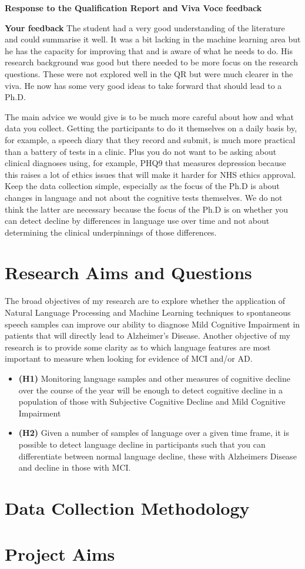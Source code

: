 \documentclass[11pt]{article}
\begin{document}
\textbf{Response to the Qualification Report and Viva Voce feedback}
\par 
\textbf{Your feedback}
The student had a very good understanding of the literature and could summarise it well. It was a bit lacking in the machine learning area but he has the capacity for improving that and is aware of what he needs to do. His research background was good but there needed to be more focus on the research questions. These were not explored well in the QR but were much clearer in the viva. He now has some very good ideas to take forward that should lead to a Ph.D.
\par 
The main advice we would give is to be much more careful about how and what data you collect. Getting the participants to do it themselves on a daily basis by, for example, a speech diary that they record and submit, is much more practical than a battery of tests in a clinic. Plus you do not want to be asking about clinical diagnoses using, for example, PHQ9 that measures depression because this raises a lot of ethics issues that will make it harder for NHS ethics approval. Keep the data collection simple, especially as the focus of the Ph.D is about changes in language and not about the cognitive tests themselves. We do not think the latter are necessary because the focus of the Ph.D is on whether you can detect decline by differences in language use over time and not about determining the clinical underpinnings of those differences.

\section{Research Aims and Questions}
The broad objectives of my research are to explore whether the application of Natural Language Processing and Machine Learning techniques to spontaneous speech samples can improve our ability to diagnose Mild Cognitive Impairment in patients that will directly lead to Alzheimer's Disease. Another objective of my research is to provide some clarity as to which language features are most important to measure when looking for evidence of MCI and/or AD. 
\begin{itemize}
	\item \textbf{(H1)} Monitoring language samples and other measures of cognitive decline over the course of the year will be enough to detect cognitive decline in a population of those with Subjective Cognitive Decline and Mild Cognitive Impairment
	\item \textbf{(H2)} Given a number of samples of language over a given time frame, it is possible to detect language decline in participants such that you can differentiate between normal language decline, these with Alzheimers Disease and decline in those with MCI.
\end{itemize}

\section{Data Collection Methodology}


\section{Project Aims}
\end{document}
